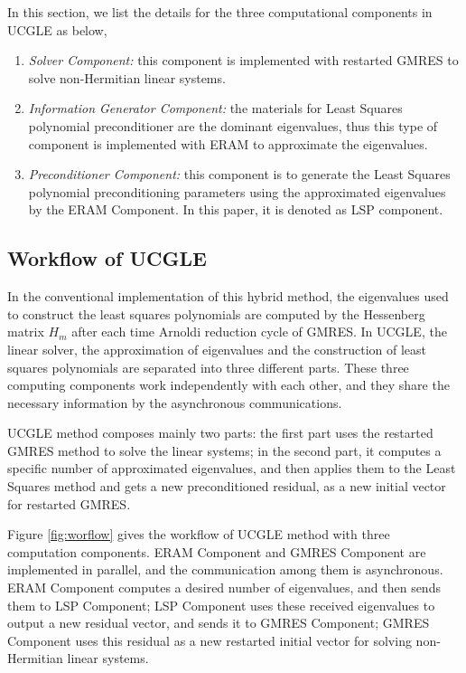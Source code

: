 In this section, we list the details for the three computational components in UCGLE as below,

\begin{enumerate}[label=(\arabic*)]
	\item \textit{Solver Component: }this component is implemented with restarted GMRES to solve non-Hermitian linear systems.
	\item  \textit{Information Generator Component: }the materials for Least Squares polynomial preconditioner are the dominant eigenvalues, thus this type of component is implemented with ERAM to approximate the eigenvalues. 
	\item \textit{Preconditioner Component: }this component is to generate the Least Squares polynomial preconditioning parameters using the approximated eigenvalues by the ERAM Component. In this paper, it is denoted as LSP component.
\end{enumerate}


\subsection{Workflow of UCGLE} \label{UCGLE}

In the conventional implementation of this hybrid method, the eigenvalues used to construct the least squares polynomials are computed by the Hessenberg matrix $H_m$ after each time Arnoldi reduction cycle of GMRES. In UCGLE, the linear solver, the approximation of eigenvalues and the construction of least squares polynomials are separated into three different parts. These three computing components work independently with each other, and they share the necessary information by the asynchronous communications.

UCGLE method composes mainly two parts: the first part uses the restarted GMRES method to solve the linear systems; in the second part, it computes a specific number of approximated eigenvalues, and then applies them to the Least Squares method and gets a new preconditioned residual, as a new initial vector for restarted GMRES. 

Figure \ref{fig:worflow} gives the workflow of UCGLE method with three computation components. ERAM Component and GMRES Component are implemented in parallel, and the communication among them is asynchronous. ERAM Component computes a desired number of eigenvalues, and then sends them to LSP Component; LSP Component uses these received eigenvalues to output a new residual vector, and sends it to GMRES Component; GMRES Component uses this residual as a new restarted initial vector for solving non-Hermitian linear systems.

